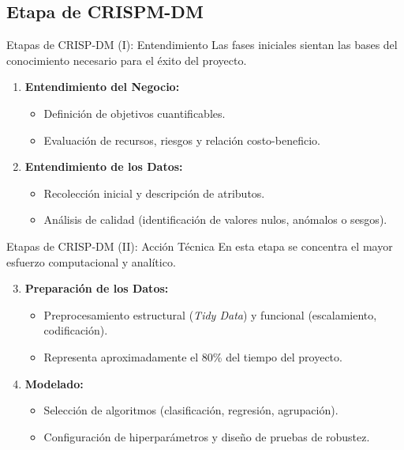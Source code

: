 \documentclass{beamer}
\begin{document}
	\subsection{Etapa de CRISPM-DM}
	\begin{frame}{Etapas de CRISP-DM (I): Entendimiento}
		Las fases iniciales sientan las bases del conocimiento necesario para el éxito del proyecto.
		\begin{enumerate}
			\item<1-> \textbf{Entendimiento del Negocio:}
			\begin{itemize}
				\item Definición de objetivos cuantificables.
				\item Evaluación de recursos, riesgos y relación costo-beneficio.
			\end{itemize}
			\item<2-> \textbf{Entendimiento de los Datos:}
			\begin{itemize}
				\item Recolección inicial y descripción de atributos.
				\item Análisis de calidad (identificación de valores nulos, anómalos o sesgos).
			\end{itemize}
		\end{enumerate}
	\end{frame}
	
	\begin{frame}{Etapas de CRISP-DM (II): Acción Técnica}
		En esta etapa se concentra el mayor esfuerzo computacional y analítico.
		\begin{enumerate}
			\setcounter{enumi}{2}
			\item \textbf{Preparación de los Datos:}
			\begin{itemize}
				\item Preprocesamiento estructural (\textit{Tidy Data}) y funcional (escalamiento, codificación).
				\item Representa aproximadamente el 80\% del tiempo del proyecto.
			\end{itemize}
			\item<2-> \textbf{Modelado:}
			\begin{itemize}
				\item Selección de algoritmos (clasificación, regresión, agrupación).
				\item Configuración de hiperparámetros y diseño de pruebas de robustez.
			\end{itemize}
		\end{enumerate}
	\end{frame}
	
\end{document}

